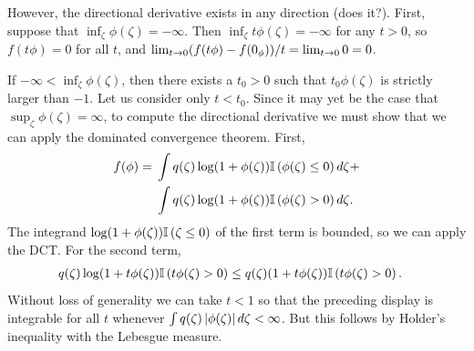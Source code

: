 \begin{ex}
However, the directional derivative exists in any direction (does it?). First,
suppose that $\inf_{\zeta} \phi(\zeta) = -\infty$.  Then $\inf_{\zeta} t
\phi(\zeta) = -\infty$ for any $t > 0$, so $f(t\phi) = 0$ for all $t$, and
$\lim_{t \rightarrow 0} (f(t \phi) - f(0_\phi)) / t = \lim_{t \rightarrow 0} 0 =
0$.
%

If $-\infty < \inf_\zeta \phi(\zeta)$, then there exists a $t_0 > 0$ such that
$t_0 \phi(\zeta)$ is strictly larger than $-1$.  Let us consider only $t < t_0$.
Since it may yet be the case that $\sup_\zeta \phi(\zeta) = \infty$, to compute
the directional derivative we must show that we can apply the dominated
convergence theorem.  First,
%
\begin{align*}
%
f(\phi) ={}&
    \int \q(\zeta) \log(1 + \phi(\zeta)) \ind{\phi(\zeta) \le 0} d\zeta + \\
    &\int \q(\zeta) \log(1 + \phi(\zeta)) \ind{\phi(\zeta) > 0} d\zeta.
%
\end{align*}
%
The integrand $\log(1 + \phi(\zeta)) \mathbb{I}\left(\zeta \le 0\right)$ of the first term
is bounded, so we can apply the DCT.  For the second term,
%
\begin{align*}
%
\q(\zeta) \log(1 + t \phi(\zeta)) \ind{t \phi(\zeta) > 0}   \le{}&
    \q(\zeta) (1 + t \phi(\zeta)) \ind{t \phi(\zeta) > 0}.%
\end{align*}
%
Without loss of generality we can take $t < 1$ so that the preceding display is
integrable for all $t$ whenever $\int q(\zeta) \left|\phi(\zeta)\right| d\zeta <
\infty$. But this follows by Holder's inequality with the Lebesgue measure.


%




\end{ex}

